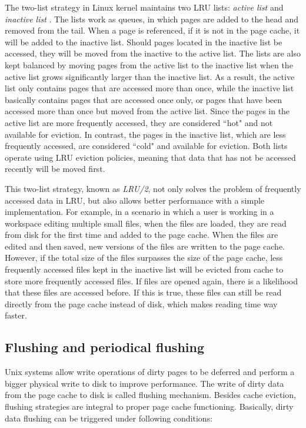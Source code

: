 The two-list strategy in Linux kernel maintains two LRU lists: 
\textit{active list} and \textit{inactive list} 
\cite{linuxdev3rd2010,bovet2005understanding}.
The lists work as queues, in which pages are added to the head and 
removed from the tail.
When a page is referenced, if it is not in the page cache, it will be added 
to the inactive list.
Should pages located in the inactive list be accessed, they will be moved 
from the inactive to the active list. 
The lists are also kept balanced by moving pages from the active list to the 
inactive list when the active list grows significantly larger than the 
inactive list.
As a result, the active list only contains pages that are accessed more 
than once, while the inactive list basically contains pages that are accessed 
once only, or pages that have been accessed more than once but moved 
from the active list.
Since the pages in the active list are more frequently accessed, they are 
considered ``hot" and not available for eviction. In contrast, the pages in the 
inactive list, which are less frequently accessed, are considered ``cold" 
and available for eviction.
Both lists operate using LRU eviction policies, meaning that data that has
not be accessed recently will be moved first.

This two-list strategy, known as \textit{LRU/2}, not only solves the problem 
of frequently accessed data in LRU, but also allows better performance with 
a simple implementation. 
For example, in a scenario in which a user is working in a 
workspace editing multiple small files, when the files are loaded, they are 
read from disk for the first time and added to the page cache. 
When the files are edited and then saved, new versions of the files are 
written to the page cache.
However, if the total size of the files surpasses the size of the 
page cache, less frequently accessed files kept in the inactive list 
will be evicted from cache to store more frequently accessed files. 
If files are opened again, there is a likelihood that these files are accessed 
before. If this is true, these files can still be read directly from the page cache 
instead of disk, which makes reading time way faster.  

\subsection{Flushing and periodical flushing}

Unix systems allow write operations of dirty pages to be deferred and perform 
a bigger physical write to disk to improve performance. The write of 
dirty data from the page cache to disk is called flushing mechanism. 
Besides cache eviction, flushing strategies are integral to proper 
page cache functioning.
Basically, dirty data flushing can be triggered under following conditions:

